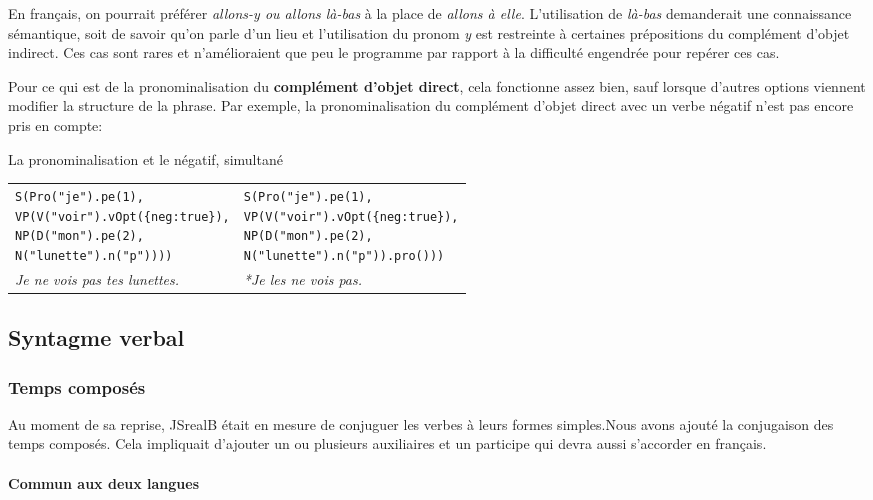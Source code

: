 \documentclass[11pt]{article} %
\newcommand{\system}[1]{\textsf{#1}}
\newcommand{\JSB}{\system{JSrealB}}
\newcommand{\real}[1]{\emph{#1}}
\begin{document}
En français, on pourrait préférer \emph{allons-y ou allons
là-bas} à la place de \emph{allons à elle}. L'utilisation de \emph{là-bas} demanderait une connaissance sémantique,
soit de savoir qu'on parle d'un lieu et l'utilisation du pronom \emph{y}
est restreinte à certaines prépositions du complément d'objet indirect.
Ces cas sont rares et n'amélioraient que peu le programme par rapport à la difficulté
engendrée pour repérer ces cas. 

Pour ce qui est de la pronominalisation du \textbf{complément d'objet
direct}, cela fonctionne assez bien, sauf lorsque d'autres options viennent
modifier la structure de la phrase. Par exemple, la pronominalisation du complément
d'objet direct avec un verbe négatif n'est pas encore pris en compte:\\
\begin{example}
\centering
\caption{La pronominalisation et le négatif, simultané}
\begin{tabular}{p{8cm} p{8cm}}
\begin{alltt}
S(Pro("je").pe(1),
  VP(V("voir").vOpt(\{neg:true\}),
     NP(D("mon").pe(2),
        N("lunette").n("p"))))
\end{alltt} &
\begin{alltt}
S(Pro("je").pe(1),
  VP(V("voir").vOpt(\{neg:true\}),
     NP(D("mon").pe(2),
        N("lunette").n("p")).pro()))
\end{alltt} \\
\real{Je ne vois pas tes lunettes.} & \real{*Je les ne vois pas.}
\end{tabular}
\end{example}

\subsection{Syntagme verbal}

\subsubsection{Temps composés}

Au moment de sa reprise, \JSB{} était en mesure de conjuguer les
verbes à leurs formes simples.Nous avons ajouté la conjugaison des temps composés.
Cela impliquait d'ajouter un ou plusieurs auxiliaires et un participe qui devra
aussi s'accorder en français.

\paragraph{Commun aux deux langues}
\end{document}
